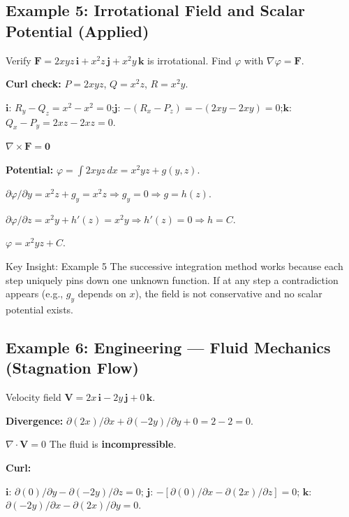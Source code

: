 \documentclass[12pt,a4paper]{article}
\begin{document}
\subsection*{Example 5: Irrotational Field and Scalar Potential (Applied)}

Verify $\mathbf{F} = 2xyz\,\mathbf{i} + x^2 z\,\mathbf{j} + x^2 y\,\mathbf{k}$ is irrotational. Find $\varphi$ with $\nabla \varphi = \mathbf{F}$.

\textbf{Curl check:} $P=2xyz$, $Q=x^2z$, $R=x^2y$.

$\mathbf{i}$: $R_y - Q_z = x^2 - x^2 = 0$;\quad $\mathbf{j}$: $-(R_x - P_z) = -(2xy-2xy)=0$;\quad $\mathbf{k}$: $Q_x-P_y = 2xz-2xz=0$.

$\nabla \times \mathbf{F} = \mathbf{0}$ \checkmark

\textbf{Potential:} $\varphi = \int 2xyz\, dx = x^2 yz + g(y,z)$.

$\partial \varphi/\partial y = x^2 z + g_y = x^2 z \Rightarrow g_y = 0 \Rightarrow g = h(z)$.

$\partial \varphi/\partial z = x^2 y + h'(z) = x^2 y \Rightarrow h'(z)=0 \Rightarrow h = C$.

$\varphi = x^2 yz + C$.

\begin{learnbox}{Key Insight: Example 5}
The successive integration method works because each step uniquely pins down one unknown function. If at any step a contradiction appears (e.g., $g_y$ depends on $x$), the field is not conservative and no scalar potential exists.
\end{learnbox}

\subsection*{Example 6: Engineering --- Fluid Mechanics (Stagnation Flow)}

Velocity field $\mathbf{V} = 2x\,\mathbf{i} - 2y\,\mathbf{j} + 0\,\mathbf{k}$.

\textbf{Divergence:} $\partial(2x)/\partial x + \partial(-2y)/\partial y + 0 = 2 - 2 = 0$.

$\nabla \cdot \mathbf{V} = 0$ \checkmark \; The fluid is \textbf{incompressible}.

\textbf{Curl:}

$\mathbf{i}$: $\partial(0)/\partial y - \partial(-2y)/\partial z = 0$;\quad
$\mathbf{j}$: $-[\partial(0)/\partial x - \partial(2x)/\partial z] = 0$;\quad
$\mathbf{k}$: $\partial(-2y)/\partial x - \partial(2x)/\partial y = 0$.
\end{document}
